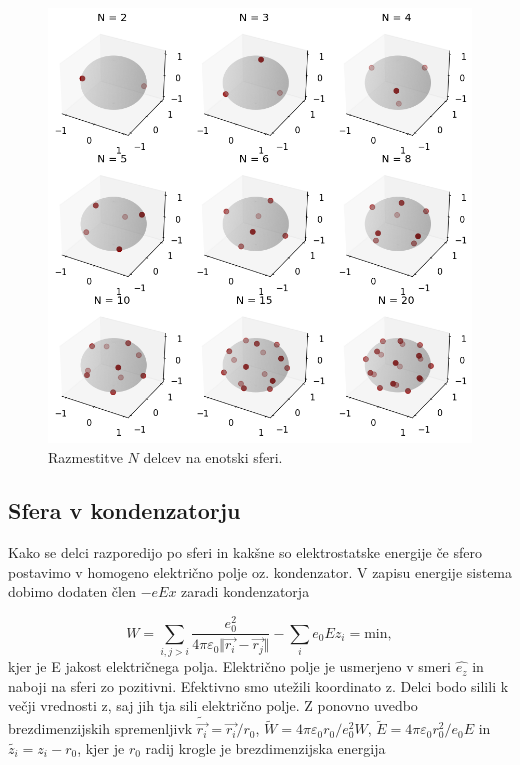 \documentclass[slovene,11pt,a4paper]{article}
\begin{document}
\begin{figure}[h!]
\centering
\includegraphics[width=12.5cm]{sfera.png}
\caption{Razmestitve $N$ delcev na enotski sferi.}
\end{figure}

\subsection{Sfera v kondenzatorju}

Kako se delci razporedijo po sferi in kakšne so elektrostatske energije če sfero postavimo v homogeno električno polje oz. kondenzator. V zapisu energije sistema dobimo dodaten člen $-eEx$ zaradi kondenzatorja

\begin{equation}
W = \sum_{i, j>i} \frac{e_0^2}{4\pi\varepsilon_0 \Vert \vec{r_i}-\vec{r_j} \Vert}
- \sum_i e_0Ez_i = \text{min},
\end{equation}
kjer je E jakost električnega polja. Električno polje je usmerjeno v smeri $\hat{e_z}$ in naboji na sferi zo pozitivni. Efektivno smo utežili koordinato z. Delci bodo silili k večji vrednosti z, saj jih tja sili električno polje. Z ponovno uvedbo brezdimenzijskih spremenljivk $\tilde{\vec{r_i}} = \vec{r_i}/r_0$, $\tilde{W} = 4\pi \varepsilon_0 r_0 / e_0^2 W$, $\tilde{E} = 4\pi \varepsilon_0 r_0^2 / e_0 E$ in $\tilde{z_i} = z_i-r_0$, kjer je $r_0$ radij krogle je brezdimenzijska energija
\end{document}
